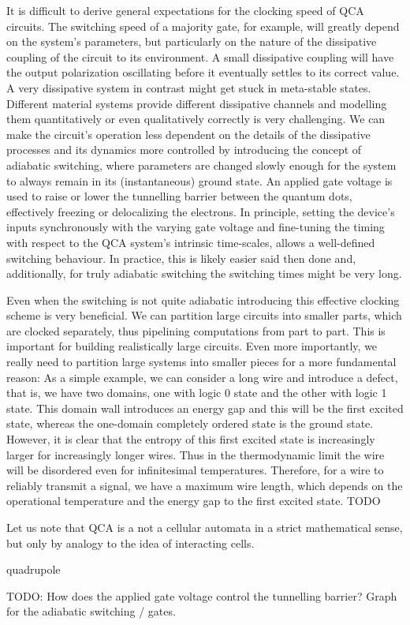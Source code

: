 It is difficult to derive general expectations for the clocking speed of QCA
circuits. The switching speed of a majority gate, for example, will greatly
depend on the system's parameters, but particularly on the nature of the
dissipative coupling of the circuit to its environment. A small dissipative
coupling will have the output polarization oscillating before it eventually
settles to its correct value. A very dissipative system in contrast might get
stuck in meta-stable states. Different material systems provide different
dissipative channels and modelling them quantitatively or even qualitatively
correctly is very challenging. We can make the circuit's operation less
dependent on the details of the dissipative processes and its dynamics more
controlled by introducing the concept of adiabatic switching, where parameters
are changed slowly enough for the system to always remain in its (instantaneous)
ground state. An applied gate voltage is used to raise or lower the tunnelling
barrier between the quantum dots, effectively freezing or delocalizing the
electrons. In principle, setting the device's inputs synchronously with the
varying gate voltage and fine-tuning the timing with respect to the QCA system's
intrinsic time-scales, allows a well-defined switching behaviour. In practice,
this is likely easier said then done and, additionally, for truly adiabatic
switching the switching times might be very long.

Even when the switching is not quite adiabatic introducing this effective
clocking scheme is very beneficial. We can partition large circuits into smaller
parts, which are clocked separately, thus pipelining computations from part to
part. This is important for building realistically large circuits. Even more
importantly, we really need to partition large systems into smaller pieces for a
more fundamental reason: As a simple example, we can consider a long wire and
introduce a defect, that is, we have two domains, one with logic 0 state and the
other with logic 1 state. This domain wall introduces an energy gap and this
will be the first excited state, whereas the one-domain completely ordered state
is the ground state. However, it is clear that the entropy of this first excited
state is increasingly larger for increasingly longer wires. Thus in the
thermodynamic limit the wire will be disordered even for infinitesimal
temperatures. Therefore, for a wire to reliably transmit a signal, we have a
maximum wire length, which depends on the operational temperature and the energy
gap to the first excited state. TODO





Let us note that QCA is a not a cellular automata in a strict mathematical sense,
but only by analogy to the idea of interacting cells.



quadrupole

TODO: How does the applied gate voltage control the tunnelling barrier?
Graph for the adiabatic switching / gates.
